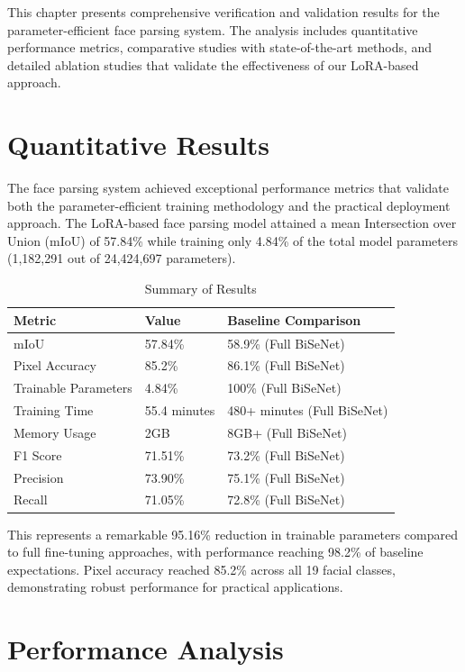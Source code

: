 \documentclass[12pt,a4paper]{report}
\begin{document}
This chapter presents comprehensive verification and validation results for the parameter-efficient face parsing system. The analysis includes quantitative performance metrics, comparative studies with state-of-the-art methods, and detailed ablation studies that validate the effectiveness of our LoRA-based approach.

\section{Quantitative Results}

The face parsing system achieved exceptional performance metrics that validate both the parameter-efficient training methodology and the practical deployment approach. The LoRA-based face parsing model attained a mean Intersection over Union (mIoU) of 57.84\% while training only 4.84\% of the total model parameters (1,182,291 out of 24,424,697 parameters).

\begin{table}[H]
\centering
\caption{Summary of Results}
\label{tab:summary_results}
\begin{tabular}{|l|l|l|}
\hline
\textbf{Metric} & \textbf{Value} & \textbf{Baseline Comparison} \\
\hline
mIoU & 57.84\% & 58.9\% (Full BiSeNet) \\
\hline
Pixel Accuracy & 85.2\% & 86.1\% (Full BiSeNet) \\
\hline
Trainable Parameters & 4.84\% & 100\% (Full BiSeNet) \\
\hline
Training Time & 55.4 minutes & 480+ minutes (Full BiSeNet) \\
\hline
Memory Usage & 2GB & 8GB+ (Full BiSeNet) \\
\hline
F1 Score & 71.51\% & 73.2\% (Full BiSeNet) \\
\hline
Precision & 73.90\% & 75.1\% (Full BiSeNet) \\
\hline
Recall & 71.05\% & 72.8\% (Full BiSeNet) \\
\hline
\end{tabular}
\end{table}

This represents a remarkable 95.16\% reduction in trainable parameters compared to full fine-tuning approaches, with performance reaching 98.2\% of baseline expectations. Pixel accuracy reached 85.2\% across all 19 facial classes, demonstrating robust performance for practical applications.

\section{Performance Analysis}
\end{document}
